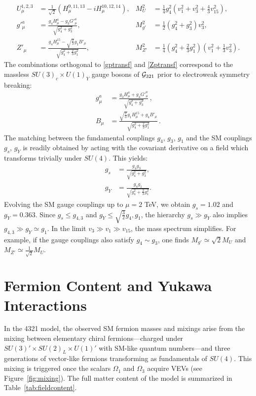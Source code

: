 \begin{align}
  U_\mu^{1,2,3} 
    &= \frac{1}{\sqrt{2}} \left( H^{9,11,13}_\mu \!\!\!- i H^{10,12,14}_\mu \right), 
  &
  M^2_{U} 
    &= \frac{1}{4} g_4^2 \left(v_1^2 + v_3^2 + \frac{4}{3} v_{15}^2\right), \label{defU} \\
  g'^a_\mu 
    &= \frac{g_4 H^a_\mu - g_3 G'^a_\mu}{\sqrt{g_4^2 + g_3^2}},
  &
  M^2_{g'} 
    &= \frac{1}{2}  (g_4^2 + g_3^2) v_3^2,\label{gptransf}\\
  Z'_\mu 
    &= \frac{g_4 H^{15}_\mu - \sqrt{\frac{2}{3}} g_1 B'_\mu}{\sqrt{g_4^2 + \frac{2}{3} g_1^2}},
  &
  M^2_{Z'} 
    &= \frac{1}{4} \left( g_4^2 + \frac{2}{3} g_1^2 \right) \left(v_1^2 + \frac{1}{3} v_3^2 \right). \label{Zptransf}
\end{align}
The combinations orthogonal to \eqref{gptransf} and \eqref{Zptransf}
correspond to the massless $SU(3)_c \times U(1)_Y$ gauge bosons of $\mathcal{G}_{\rm 321}$ 
prior to electroweak symmetry breaking:
\begin{align}
\label{gtransf} 
g^a_\mu &= \frac{g_3 H^a_\mu + g_4 G'^a_\mu}{\sqrt{g_4^2 + g_3^2}} \, , \\
\label{Btransf} 
B_\mu &= \frac{\sqrt{\frac{2}{3}} g_1 H^{15}_\mu + g_4 B'_\mu}{\sqrt{g_4^2 + \frac{2}{3} g_1^2}} \, .
\end{align}
The matching between the fundamental couplings $g_4$, $g_3$, $g_1$ and the SM couplings $g_s$, $g_Y$ is readily obtained by acting with the covariant derivative on a field which transforms trivially under $SU(4)$. This yields:
\begin{align}
\label{matchinggsgs}
g_s &= \frac{g_4 g_3}{\sqrt{g_4^2 + g_3^2}}, 
\\ 
\label{matchinggsgY}
g_Y &= \frac{g_4 g_1}{\sqrt{g_4^2 + \frac{2}{3} g_1^2}}.
\end{align}
Evolving the SM gauge couplings up to $\mu=2$ TeV, we obtain 
$g_s = 1.02$ and $g_Y = 0.363$. 
Since $g_s \leq g_{4,3}$ and $g_Y \leq \sqrt{\tfrac{3}{2}} g_{4}, g_{1}$,  
the hierarchy $g_s \gg g_Y$ also implies $g_{4,3} \gg g_Y \simeq g_1$. 
In the limit $v_3 \gg v_1 \gg v_{15}$, the mass spectrum simplifies. For example, if the gauge couplings also satisfy $g_4 \sim g_3$, one finds $M_{g'} \simeq \sqrt{2} M_U$ and $M_{Z'} \simeq \tfrac{1}{\sqrt{2}} M_U$.
\section{Fermion Content and Yukawa Interactions}

In the 4321 model, the observed SM fermion masses and mixings arise from the mixing between elementary chiral fermions—charged under $SU(3)' \times SU(2)_L \times U(1)'$ with SM-like quantum numbers—and three generations of vector-like fermions transforming as fundamentals of $SU(4)$. This mixing is triggered once the scalars $\Omega_{1}$ and $\Omega_{3}$ acquire VEVs (see Figure~\ref{fig:mixing}). The full matter content of the model is summarized in Table~\ref{tab:fieldcontent}.

